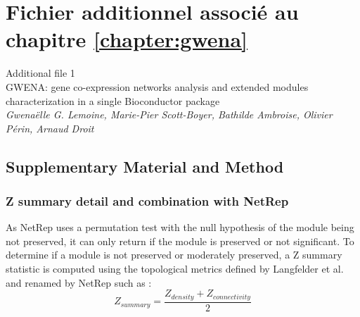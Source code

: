 \chapter{Fichier additionnel associé au chapitre \ref{chapter:gwena}}
\label{annexe:supp_file_GWENA}

\begin{center}
{\huge Additional file 1}\\
\hfill \break
{\large GWENA: gene co-expression networks analysis and extended modules characterization in a single Bioconductor package} \\ 
\hfill \break
\textit{Gwenaëlle G. Lemoine, Marie-Pier Scott-Boyer, Bathilde Ambroise, Olivier Périn, Arnaud Droit}
\end{center}


\section{Supplementary Material and Method}
\subsection{Z summary detail and combination with NetRep}
\label{supp:supp_z_summary_detail}

As NetRep uses a permutation test with the null hypothesis of the module being not preserved, it can only return if the module is preserved or not significant. To determine if a module is not preserved or moderately preserved, a Z summary statistic is computed using the topological metrics defined by Langfelder et al. \cite{Langfelder2011} and renamed by NetRep \cite{Ritchie2016} such as : \\

\[Z_{summary} = \frac{Z_{density} + Z_{connectivity}}{2}\] \\

